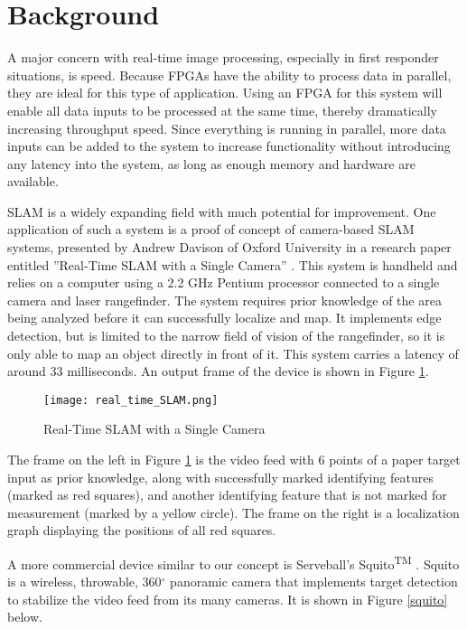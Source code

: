\section{Background}
A major concern with real-time image processing, especially in first responder situations, is speed. Because FPGAs have the ability to process data in parallel, they are ideal for this type of application. Using an FPGA for this system will enable all data inputs to be processed at the same time, thereby dramatically increasing throughput speed. Since everything is running in parallel, more data inputs can be added to the system to increase functionality without introducing any latency into the system, as long as enough memory and hardware are available.
\par
SLAM is a widely expanding field with much potential for improvement. One application of such a system is a proof of concept of camera-based SLAM systems, presented by Andrew Davison of Oxford University in a research paper entitled ''Real-Time SLAM with a Single Camera'' \cite{davison}. This system is handheld and relies on a computer using a 2.2 GHz Pentium processor connected to a single camera and laser rangefinder. The system requires prior knowledge of the area being analyzed before it can successfully localize and map. It implements edge detection, but is limited to the narrow field of vision of the rangefinder, so it is only able to map an object directly in front of it. This system carries a latency of around 33 milliseconds. An output frame of the device is shown in Figure \ref{rtSLAM}.

\begin{figure}[H]
	\centerline{\texttt{[image: real\_time\_SLAM.png]}}
	\caption{Real-Time SLAM with a Single Camera \cite{davison}}
	\label{rtSLAM}
\end{figure}

The frame on the left in Figure \ref{rtSLAM} is the video feed with 6 points of a paper target input as prior knowledge, along with successfully marked identifying features (marked as red squares), and another identifying feature that is not marked for measurement (marked by a yellow circle). The frame on the right is a localization graph displaying the positions of all red squares.
\par
A more commercial device similar to our concept is Serveball's Squito\textsuperscript{TM} \cite{serveball}. Squito is a wireless, throwable, 360$^{\circ}$ panoramic camera that implements target detection to stabilize the video feed from its many cameras. It is shown in Figure \ref{squito} below.

